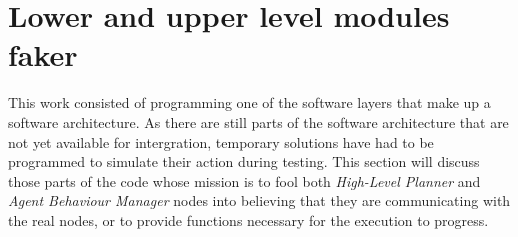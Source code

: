 \section{Lower and upper level modules faker}
\label{sec:LowerAndUpperLevelModulesFaker}

This work consisted of programming one of the software layers that make up a software architecture. As there are still parts of the software architecture that are not yet available for intergration, temporary solutions have had to be programmed to simulate their action during testing. This section will discuss those parts of the code whose mission is to fool both \emph{High-Level Planner} and \emph{Agent Behaviour Manager} nodes into believing that they are communicating with the real nodes, or to provide functions necessary for the execution to progress.

